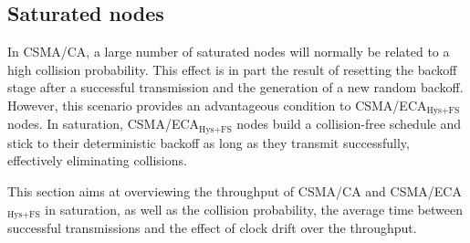 \documentclass[a4paper,journal]{IEEEtran}
\providecommand{\DIFaddend}{} %
\begin{document}

	\DIFaddend \subsection{Saturated nodes}\label{resultsSaturated}
	In CSMA/CA, a large number of saturated nodes will normally be related to a high collision probability. This effect is in part the result of resetting the backoff stage after a successful transmission and the generation of a new random backoff. However, this scenario provides an advantageous condition to CSMA/ECA$_{\text{Hys+FS}}$ nodes. In saturation, CSMA/ECA$_{\text{Hys+FS}}$ nodes build a collision-free schedule and stick to their deterministic backoff as long as they transmit successfully, effectively eliminating collisions.

	This section aims at overviewing the throughput of CSMA/CA and CSMA/ECA$_{\text{Hys+FS}}$ in saturation, as well as the collision probability, the average time between successful transmissions and the effect of clock drift over the throughput.
	\\
\end{document}
